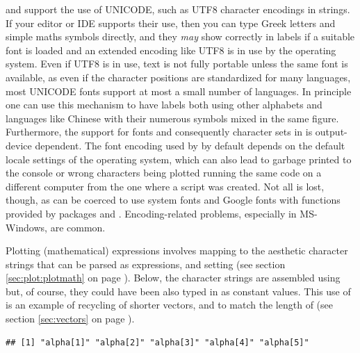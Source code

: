 \documentclass[krantz2]{krantz}\usepackage{knitr}
\begin{document}
\begin{warningbox}
\Rlang{} and \ggplot support the use of UNICODE, such as UTF8 character encodings in strings. If your editor or IDE supports their use, then you can type Greek letters and simple maths symbols directly, and they \emph{may} show correctly in labels if a suitable font is loaded and an extended encoding like UTF8 is in use by the operating system. Even if UTF8 is in use, text is not fully portable unless the same font is available, as even if the character positions are standardized for many languages, most UNICODE fonts support at most a small number of languages. In principle one can use this mechanism to have labels both using other alphabets and languages like Chinese with their numerous symbols mixed in the same figure. Furthermore, the support for fonts and consequently character sets in \Rlang is output-device dependent. The font encoding used by \Rlang by default depends on the default locale settings of the operating system, which can also lead to garbage printed to the console or wrong characters being plotted running the same code on a different computer from the one where a script was created. Not all is lost, though, as \Rlang can be coerced to use system fonts and Google fonts with functions provided by packages  and . Encoding-related problems, especially in MS-Windows, are common.
\end{warningbox}

Plotting (mathematical) expressions involves mapping to the  aesthetic character strings that can be parsed as expressions, and setting  (see section \ref{sec:plot:plotmath} on page \pageref{sec:plot:plotmath}). Below, the character strings are assembled using  but, of course, they could have been also typed in as constant values. This use of  is an example of recycling of shorter vectors, \code{"alpha["} and \code{"]"} to match the length of  (see section \ref{sec:vectors} on page \pageref{sec:vectors}).

\begin{knitrout}\footnotesize
{}\color{fgcolor}\begin{kframe}
\begin{alltt}
 \hlkwb{<-}
  \hlstd{(} \hlstd{=} \hlopt{:}\hlstd{,}  \hlstd{=} \hlstd{(}\hlstd{,} \hlstd{),}  \hlstd{=} \hlstd{(}\hlstr{"alpha["}\hlstd{,} \hlopt{:}\hlstd{,} \hlstr{"]"}\hlstd{,}  \hlstd{=} \hlstd{))}
\hlopt{$}
\end{alltt}
\begin{verbatim}
## [1] "alpha[1]" "alpha[2]" "alpha[3]" "alpha[4]" "alpha[5]"
\end{verbatim}
\end{kframe}
\end{knitrout}
\end{document}
